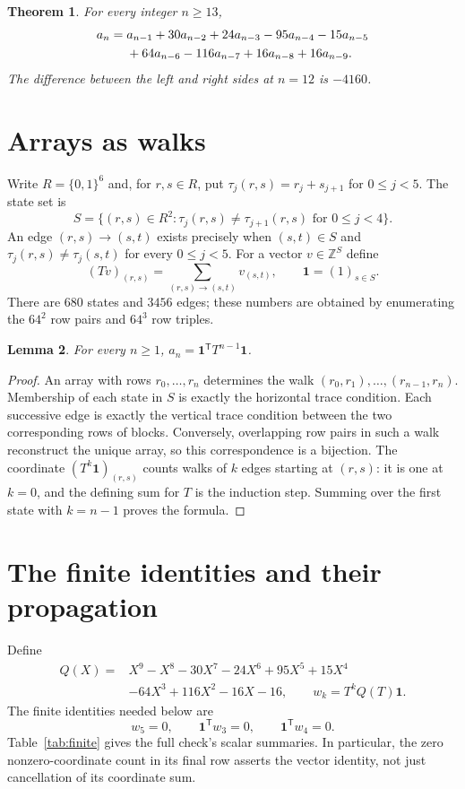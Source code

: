 \documentclass[11pt]{article}
\newtheorem{theorem}{Theorem}
\newtheorem{lemma}[theorem]{Lemma}
\begin{document}
\begin{theorem}\label{thm:main}
For every integer $n\geq13$,
\begin{align}
 a_n={}&a_{n-1}+30a_{n-2}+24a_{n-3}-95a_{n-4}-15a_{n-5}\notag\\
       &+64a_{n-6}-116a_{n-7}+16a_{n-8}+16a_{n-9}.\label{eq:rec}
\end{align}
The difference between the left and right sides at $n=12$ is $-4160$.
\end{theorem}

\section{Arrays as walks}
Write $R=\{0,1\}^6$ and, for $r,s\in R$, put
$\tau_j(r,s)=r_j+s_{j+1}$ for $0\leq j<5$.
The state set is
\[
 S=\{(r,s)\in R^2:\tau_j(r,s)\ne\tau_{j+1}(r,s)
                         \text{ for }0\leq j<4\}.
\]
An edge $(r,s)\longrightarrow(s,t)$ exists precisely when $(s,t)\in S$
and $\tau_j(r,s)\ne\tau_j(s,t)$ for every $0\leq j<5$.
For a vector $v\in\mathbb Z^S$ define
\[
 (Tv)_{(r,s)}=\sum_{(r,s)\to(s,t)}v_{(s,t)},
 \qquad \mathbf1=(1)_{s\in S}.
\]
There are $680$ states and $3456$ edges; these numbers are obtained by
enumerating the $64^2$ row pairs and $64^3$ row triples.

\begin{lemma}\label{lem:count}
For every $n\geq1$, $a_n=\mathbf1^{\mathsf T}T^{n-1}\mathbf1$.
\end{lemma}
\begin{proof}
An array with rows $r_0,\ldots,r_n$ determines the walk
$(r_0,r_1),\ldots,(r_{n-1},r_n)$. Membership of each state in $S$
is exactly the horizontal trace condition. Each successive edge is
exactly the vertical trace condition between the two corresponding
rows of blocks. Conversely, overlapping row pairs in such a walk
reconstruct the unique array, so this correspondence is a bijection.
The coordinate $(T^k\mathbf1)_{(r,s)}$ counts walks of $k$ edges
starting at $(r,s)$: it is one at $k=0$, and the defining sum for $T$
is the induction step. Summing over the first state with $k=n-1$
proves the formula.
\end{proof}

\section{The finite identities and their propagation}
Define
\begin{align*}
 Q(X)={}&X^9-X^8-30X^7-24X^6+95X^5+15X^4\\
        &-64X^3+116X^2-16X-16,\qquad
 w_k=T^kQ(T)\mathbf1.
\end{align*}
The finite identities needed below are
\begin{equation}\label{eq:finite}
 w_5=0,\qquad \mathbf1^{\mathsf T}w_3=0,\qquad
 \mathbf1^{\mathsf T}w_4=0.
\end{equation}
Table~\ref{tab:finite} gives the full check's scalar summaries. In
particular, the zero nonzero-coordinate count in its final row asserts
the vector identity, not just cancellation of its coordinate sum.
\end{document}
